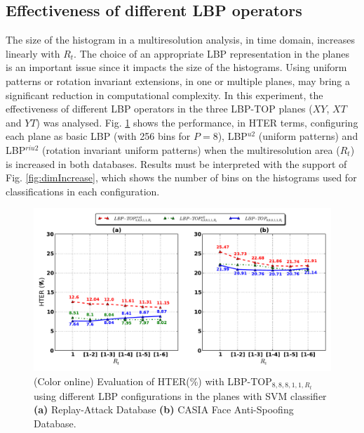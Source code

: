 \subsection{Effectiveness of different LBP operators}
\label{sec_different_lbp_operators}


The size of the histogram in a multiresolution analysis, in time domain, increases linearly with $R_t$. The choice of an appropriate LBP representation in the planes is an important issue since it impacts the size of the histograms. Using uniform patterns or rotation invariant extensions, in one or multiple planes, may bring a significant reduction in computational complexity. In this experiment, the effectiveness of different LBP operators in the three LBP-TOP planes ($XY$, $XT$ and $YT$) was analysed. Fig. \ref{fig:evaluation_LBP-operator} shows the performance, in HTER terms, configuring each plane as basic LBP (with 256 bins for $P=8$), LBP$^{u2}$ (uniform patterns) and LBP$^{riu2}$ (rotation invariant uniform patterns) when the multiresolution area ($R_t$) is increased in both databases. Results must be interpreted with the support of Fig. \ref{fig:dimIncrease}, which shows the number of bins on the histograms used for classifications in each configuration.


\begin{figure}[!btb]
\begin{center}
\includegraphics [width=\textwidth] {images/proposed_countermeasure/evaluation_LBP-operator.pdf}
\caption{(Color online) Evaluation of HTER(\%) with LBP-TOP$_{8,8,8,1,1,R_t}$ using different LBP configurations in the planes with SVM classifier \textbf{(a)} Replay-Attack Database \textbf{(b)} CASIA Face Anti-Spoofing Database.}
\label{fig:evaluation_LBP-operator}
\end{center}
\end{figure}

